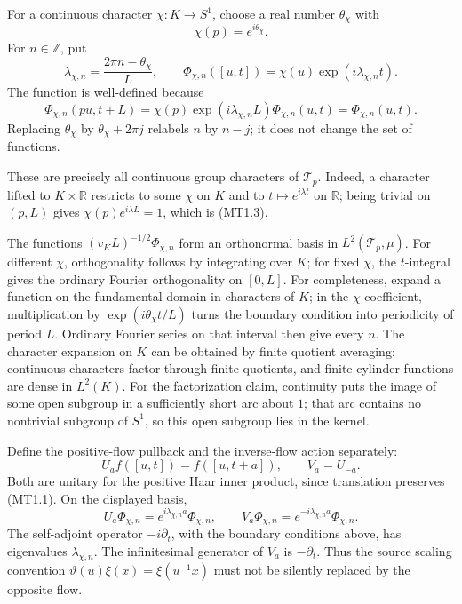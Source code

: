 For a continuous character \(\chi:K\to S^1\), choose a real number
\(\theta_\chi\) with \[
 \chi(p)=e^{i\theta_\chi}.
\tag{MT1.2}
\] For \(n\in\mathbb Z\), put \[
 \lambda_{\chi,n}=\frac{2\pi n-\theta_\chi}{L},\qquad
 \Phi_{\chi,n}([u,t])
   =\chi(u)\exp(i\lambda_{\chi,n}t).
\tag{MT1.3}
\] The function is well-defined because \[
 \Phi_{\chi,n}(pu,t+L)
  =\chi(p)\exp(i\lambda_{\chi,n}L)\Phi_{\chi,n}(u,t)
  =\Phi_{\chi,n}(u,t).
\tag{MT1.4}
\] Replacing \(\theta_\chi\) by \(\theta_\chi+2\pi j\) relabels \(n\) by
\(n-j\); it does not change the set of functions.

These are precisely all continuous group characters of \(\mathcal T_p\).
Indeed, a character lifted to \(K\times\mathbb R\) restricts to some
\(\chi\) on \(K\) and to \(t\mapsto e^{i\lambda t}\) on \(\mathbb R\);
being trivial on \((p,L)\) gives \(\chi(p)e^{i\lambda L}=1\), which is
(MT1.3).

The functions \((v_KL)^{-1/2}\Phi_{\chi,n}\) form an orthonormal basis
in \(L^2(\mathcal T_p,\mu)\). For different \(\chi\), orthogonality
follows by integrating over \(K\); for fixed \(\chi\), the
\(t\)-integral gives the ordinary Fourier orthogonality on \([0,L]\).
For completeness, expand a function on the fundamental domain in
characters of \(K\); in the \(\chi\)-coefficient, multiplication by
\(\exp(i\theta_\chi t/L)\) turns the boundary condition into periodicity
of period \(L\). Ordinary Fourier series on that interval then give
every \(n\). The character expansion on \(K\) can be obtained by finite
quotient averaging: continuous characters factor through finite
quotients, and finite-cylinder functions are dense in \(L^2(K)\). For
the factorization claim, continuity puts the image of some open subgroup
in a sufficiently short arc about \(1\); that arc contains no nontrivial
subgroup of \(S^1\), so this open subgroup lies in the kernel.

Define the positive-flow pullback and the inverse-flow action
separately: \[
 U_a f([u,t])=f([u,t+a]),\qquad V_a=U_{-a}.
\tag{MT1.5}
\] Both are unitary for the positive Haar inner product, since
translation preserves (MT1.1). On the displayed basis, \[
 U_a\Phi_{\chi,n}=e^{i\lambda_{\chi,n}a}\Phi_{\chi,n},
 \qquad
 V_a\Phi_{\chi,n}=e^{-i\lambda_{\chi,n}a}\Phi_{\chi,n}.
\tag{MT1.6}
\] The self-adjoint operator \(-i\partial_t\), with the boundary
conditions above, has eigenvalues \(\lambda_{\chi,n}\). The
infinitesimal generator of \(V_a\) is \(-\partial_t\). Thus the source
scaling convention \(\vartheta(u)\xi(x)=\xi(u^{-1}x)\) must not be
silently replaced by the opposite flow.

